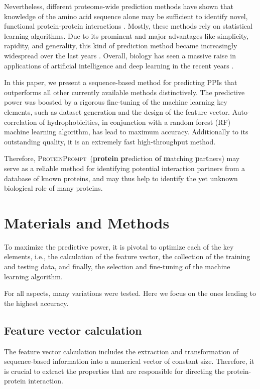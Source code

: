 \documentclass{bioinfo}
\newcommand{\tool}{\textsc{ProteinPrompt}}
\begin{document}
Nevertheless, different proteome-wide prediction methods have shown
that knowledge of the amino acid sequence alone may be sufficient to
identify novel, functional protein-protein interactions
\citep{Martin:2005, Shen:2007}.
Mostly, these methods rely on statistical learning algorithms.
Due to its prominent and major advantages like simplicity, rapidity, and generality, this kind of
prediction method became increasingly widespread over the last years
\citep{Ofran:2003, Betel:2007, Liu:2012, Perovic:2017, Pan:2010}.
Overall, biology has seen a massive raise in applications
of artificial intelligence and deep learning in the recent years
\citep{Ching:2018}.

In this paper, we present a sequence-based method for predicting
PPIs that outperforms all other currently available methods distinctively.
The predictive power was boosted by a rigorous fine-tuning
of the machine learning key elements, such as
dataset generation and the design of the feature vector.
Auto-correlation of hydrophobicities,
in conjunction with a random forest (RF) machine learning algorithm,
has lead to maximum accuracy.
Additionally to its outstanding quality, it is 
an extremely fast high-throughput
method.

Therefore, \tool\  (\textbf{protein} \textbf{pr}ediction \textbf{o}f \textbf{m}atching \textbf{p}ar\textbf{t}ners)
may serve as a reliable method for identifying potential interaction partners from a database of
known proteins, and may thus help to identify the yet unknown
biological role of many proteins.


\section{Materials and Methods}

To maximize the predictive power, it is pivotal to optimize each of
the key elements, i.e., the calculation of the feature vector, the
collection of the training and testing data, and finally, the
selection and fine-tuning of the machine learning algorithm. 

For all aspects, many variations were tested. Here we focus on the
ones leading to the highest accuracy. 


\subsection{Feature vector calculation}
The feature vector calculation includes the extraction and
transformation of sequence-based information into a numerical vector
of constant size. Therefore, it is crucial to extract the properties
that are responsible for directing the protein-protein interaction. 
\end{document}
